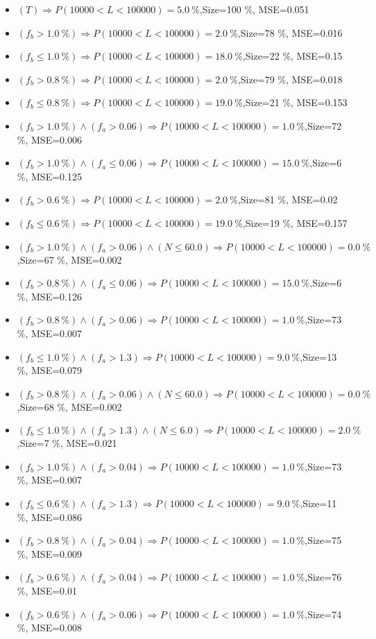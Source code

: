 \documentclass[numbered]{CSL}
\begin{document}
\begin{itemize}
\item $(T) \Rightarrow P(10 000 < L < 100 000) = 5.0~\%$,\hfill Size=100 \%, MSE=0.051
\item $(f_b > 1.0~\%) \Rightarrow P(10 000 < L < 100 000) = 2.0~\%$,\hfill Size=78 \%, MSE=0.016
\item $(f_b \leq 1.0~\%) \Rightarrow P(10 000 < L < 100 000) = 18.0~\%$,\hfill Size=22 \%, MSE=0.15
\item $(f_b > 0.8~\%) \Rightarrow P(10 000 < L < 100 000) = 2.0~\%$,\hfill Size=79 \%, MSE=0.018
\item $(f_b \leq 0.8~\%) \Rightarrow P(10 000 < L < 100 000) = 19.0~\%$,\hfill Size=21 \%, MSE=0.153
\item $(f_b > 1.0~\%) \land (f_a > 0.06) \Rightarrow P(10 000 < L < 100 000) = 1.0~\%$,\hfill Size=72 \%, MSE=0.006
\item $(f_b > 1.0~\%) \land (f_a \leq 0.06) \Rightarrow P(10 000 < L < 100 000) = 15.0~\%$,\hfill Size=6 \%, MSE=0.125
\item $(f_b > 0.6~\%) \Rightarrow P(10 000 < L < 100 000) = 2.0~\%$,\hfill Size=81 \%, MSE=0.02
\item $(f_b \leq 0.6~\%) \Rightarrow P(10 000 < L < 100 000) = 19.0~\%$,\hfill Size=19 \%, MSE=0.157
\item $(f_b > 1.0~\%) \land (f_a > 0.06) \land (N \leq 60.0) \Rightarrow P(10 000 < L < 100 000) = 0.0~\%$,\hfill Size=67 \%, MSE=0.002
\item $(f_b > 0.8~\%) \land (f_a \leq 0.06) \Rightarrow P(10 000 < L < 100 000) = 15.0~\%$,\hfill Size=6 \%, MSE=0.126
\item $(f_b > 0.8~\%) \land (f_a > 0.06) \Rightarrow P(10 000 < L < 100 000) = 1.0~\%$,\hfill Size=73 \%, MSE=0.007
\item $(f_b \leq 1.0~\%) \land (f_a > 1.3) \Rightarrow P(10 000 < L < 100 000) = 9.0~\%$,\hfill Size=13 \%, MSE=0.079
\item $(f_b > 0.8~\%) \land (f_a > 0.06) \land (N \leq 60.0) \Rightarrow P(10 000 < L < 100 000) = 0.0~\%$,\hfill Size=68 \%, MSE=0.002
\item $(f_b \leq 1.0~\%) \land (f_a > 1.3) \land (N \leq 6.0) \Rightarrow P(10 000 < L < 100 000) = 2.0~\%$,\hfill Size=7 \%, MSE=0.021
\item $(f_b > 1.0~\%) \land (f_a > 0.04) \Rightarrow P(10 000 < L < 100 000) = 1.0~\%$,\hfill Size=73 \%, MSE=0.007
\item $(f_b \leq 0.6~\%) \land (f_a > 1.3) \Rightarrow P(10 000 < L < 100 000) = 9.0~\%$,\hfill Size=11 \%, MSE=0.086
\item $(f_b > 0.8~\%) \land (f_a > 0.04) \Rightarrow P(10 000 < L < 100 000) = 1.0~\%$,\hfill Size=75 \%, MSE=0.009
\item $(f_b > 0.6~\%) \land (f_a > 0.04) \Rightarrow P(10 000 < L < 100 000) = 1.0~\%$,\hfill Size=76 \%, MSE=0.01
\item $(f_b > 0.6~\%) \land (f_a > 0.06) \Rightarrow P(10 000 < L < 100 000) = 1.0~\%$,\hfill Size=74 \%, MSE=0.008
\end{itemize}
\end{document}
